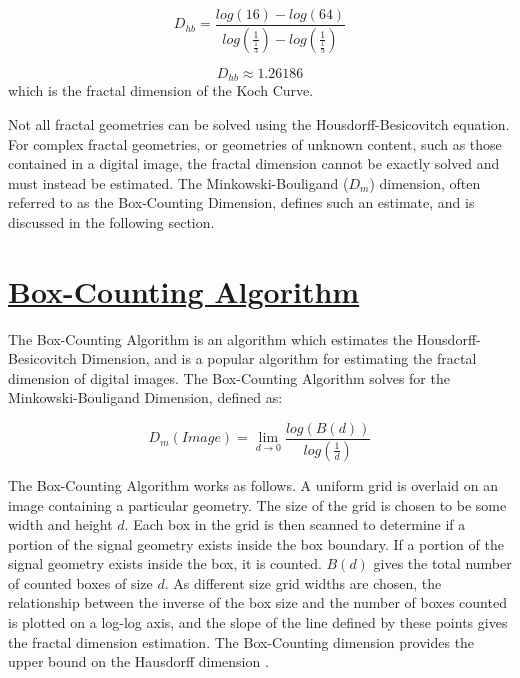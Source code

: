 \documentclass[12pt, oneside]{book}
\begin{document}
\begin{equation} \tag{4}
D_{hb} = \frac{log(16) - log(64) }{log( \frac{1}{\frac{1}{3}}) - log(\frac{1}{\frac{1}{9}})}
\end{equation}

\begin{equation} \tag{5}
D_{hb} \approx 1.26186
\end{equation}
which is the fractal dimension of the Koch Curve.

Not all fractal geometries can be solved using the Housdorff-Besicovitch equation.  For complex fractal geometries, or geometries of unknown content, such as those contained in a digital image, the fractal dimension cannot be exactly solved and must instead be estimated.  The Minkowski-Bouligand (\(D_{m}\)) dimension, often referred to as the Box-Counting Dimension, defines such an estimate, and is discussed in the following section.  

\section{\underline{Box-Counting Algorithm}}
The Box-Counting Algorithm is an algorithm which estimates the Housdorff-Besicovitch Dimension, and is a popular algorithm for estimating the fractal dimension of digital images.  The Box-Counting Algorithm solves for the Minkowski-Bouligand Dimension, defined as:  

\begin{equation} \tag{6}
D_{m}(Image) = \lim_{d \to 0} \frac{log( B(d) )}{log(\frac{1}{d})}
\end{equation} 

The Box-Counting Algorithm works as follows.  A uniform grid is overlaid on an image containing a particular geometry.  The size of the grid is chosen to be some width and height \(d\).  Each box in the grid is then scanned to determine if a portion of the signal geometry exists inside the box boundary.  If a portion of the signal geometry exists inside the box, it is counted.  \(B(d)\) gives the total number of counted boxes of size \(d\). As different size grid widths are chosen, the relationship between the inverse of the box size and the number of boxes counted is plotted on a log-log axis, and the slope of the line defined by these points gives the fractal dimension estimation.  The Box-Counting dimension provides the upper bound on the Hausdorff dimension \cite{camastra_data_2003}. 
\end{document}

